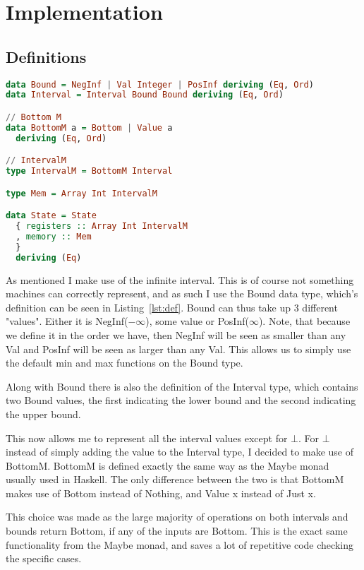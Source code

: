 \section{Implementation}

\subsection{Definitions}\label{sec:def}
\begin{lstlisting}[language={haskell}, caption={Bound data type}, label={lst:def}]
data Bound = NegInf | Val Integer | PosInf deriving (Eq, Ord)
data Interval = Interval Bound Bound deriving (Eq, Ord)

// Bottom M
data BottomM a = Bottom | Value a
  deriving (Eq, Ord)

// IntervalM
type IntervalM = BottomM Interval

type Mem = Array Int IntervalM

data State = State
  { registers :: Array Int IntervalM
  , memory :: Mem
  }
  deriving (Eq)
\end{lstlisting}
As mentioned I make use of the infinite interval. This is of course not
something machines can correctly represent, and as such I use the Bound data
type, which's definition can be seen in Listing~\ref{lst:def}. Bound can thus
take up 3 different "values". Either it is NegInf($-\infty$), some value or
PosInf($\infty$). Note, that because we define it in the order we have, then
NegInf will be seen as smaller than any Val and PosInf will be seen as larger
than any Val. This allows us to simply use the default min and max functions on
the Bound type.

Along with Bound there is also the definition of the Interval type, which
contains two Bound values, the first indicating the lower bound and the second
indicating the upper bound.

This now allows me to represent all the interval values except for $\bot$. For
$\bot$ instead of simply adding the value to the Interval type, I decided to
make use of BottomM. BottomM is defined exactly the same way as the Maybe monad
usually used in Haskell. The only difference between the two is that BottomM
makes use of Bottom instead of Nothing, and Value x instead of Just x.

This choice was made as the large majority of operations on both intervals and
bounds return Bottom, if any of the inputs are Bottom. This is the exact same
functionality from the Maybe monad, and saves a lot of repetitive code checking
the specific cases.

